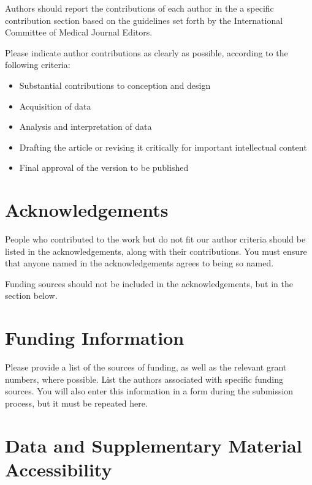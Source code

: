 \documentclass[
]{article}
\providecommand{\tightlist}{%
  \setlength{\itemsep}{0pt}\setlength{\parskip}{0pt}}\usepackage{longtable,booktabs,array}
\begin{document}
Authors should report the contributions of each author in the a specific
contribution section based on the guidelines set forth by the
International Committee of Medical Journal Editors.

Please indicate author contributions as clearly as possible, according
to the following criteria:

\begin{itemize}
\tightlist
\item
  Substantial contributions to conception and design
\item
  Acquisition of data
\item
  Analysis and interpretation of data
\item
  Drafting the article or revising it critically for important
  intellectual content
\item
  Final approval of the version to be published
\end{itemize}

\hypertarget{acknowledgements}{%
\section{Acknowledgements}\label{acknowledgements}}

People who contributed to the work but do not fit our author criteria
should be listed in the acknowledgements, along with their
contributions. You must ensure that anyone named in the acknowledgements
agrees to being so named.

Funding sources should not be included in the acknowledgements, but in
the section below.

\hypertarget{funding-information}{%
\section{Funding Information}\label{funding-information}}

Please provide a list of the sources of funding, as well as the relevant
grant numbers, where possible. List the authors associated with specific
funding sources. You will also enter this information in a form during
the submission process, but it must be repeated here.

\hypertarget{data-and-supplementary-material-accessibility}{%
\section{Data and Supplementary Material
Accessibility}\label{data-and-supplementary-material-accessibility}}
\end{document}
